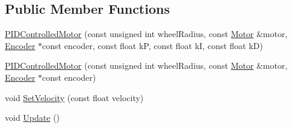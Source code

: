 \subsection*{Public Member Functions}
\begin{DoxyCompactItemize}
\item 
\hyperlink{class_p_i_d_controlled_motor_a09bc1d7398c15091b44c98b29fc1f073}{P\-I\-D\-Controlled\-Motor} (const unsigned int wheel\-Radius, const \hyperlink{class_motor}{Motor} \&motor, \hyperlink{class_encoder}{Encoder} $\ast$const encoder, const float k\-P, const float k\-I, const float k\-D)
\item 
\hyperlink{class_p_i_d_controlled_motor_a6cb0559e4413a30318ba576d59cd3fff}{P\-I\-D\-Controlled\-Motor} (const unsigned int wheel\-Radius, const \hyperlink{class_motor}{Motor} \&motor, \hyperlink{class_encoder}{Encoder} $\ast$const encoder)
\item 
void \hyperlink{class_p_i_d_controlled_motor_a045762a3ef93b7b25a6339cda504e4e5}{Set\-Velocity} (const float velocity)
\item 
void \hyperlink{class_p_i_d_controlled_motor_a7ab5288c0d1df6540475634c9a150df2}{Update} ()
\end{DoxyCompactItemize}



